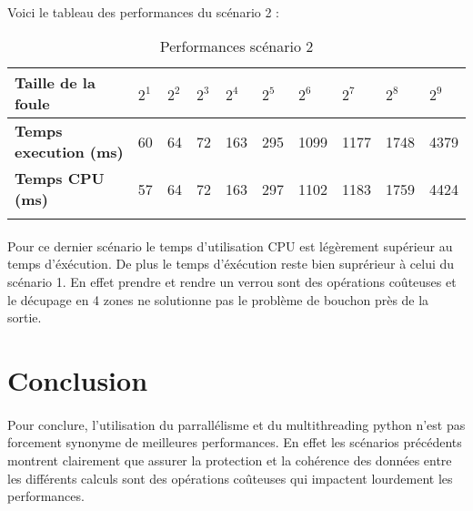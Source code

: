 \documentclass[12pt,oneside,a4paper]{article}
\begin{document}
\paragraph{}
Voici le tableau des performances du scénario 2 :

\begin{table}[h]
  \centering
  \small
  \begin{tabular}{llllllllll}
  \hline
  \multicolumn{1}{|l|}{\textbf{Taille de la foule}}                     & \multicolumn{1}{l|}{$2^1$} & \multicolumn{1}{l|}{$2^2$} & \multicolumn{1}{l|}{$2^3$} & \multicolumn{1}{l|}{$2^4$} & \multicolumn{1}{l|}{$2^5$} & \multicolumn{1}{l|}{$2^6$} & \multicolumn{1}{l|}{$2^7$} & \multicolumn{1}{l|}{$2^8$} & \multicolumn{1}{l|}{$2^9$} \\ \hline
  \multicolumn{1}{|l|}{\textbf{Temps execution (ms)}} & \multicolumn{1}{l|}{60}  & \multicolumn{1}{l|}{64}  & \multicolumn{1}{l|}{72}  & \multicolumn{1}{l|}{163}  & \multicolumn{1}{l|}{295}  & \multicolumn{1}{l|}{1099}  & \multicolumn{1}{l|}{1177}  & \multicolumn{1}{l|}{1748}  & \multicolumn{1}{l|}{4379}  \\ \hline
  \multicolumn{1}{|l|}{\textbf{Temps CPU (ms)}}    & \multicolumn{1}{l|}{57}  & \multicolumn{1}{l|}{64}  & \multicolumn{1}{l|}{72}  & \multicolumn{1}{l|}{163}  & \multicolumn{1}{l|}{297}  & \multicolumn{1}{l|}{1102}  & \multicolumn{1}{l|}{1183}  & \multicolumn{1}{l|}{1759}  & \multicolumn{1}{l|}{4424}  \\ \hline
                                                                        &                        &                        &                        &                        &                        &                        &                        &                        &                       
  \end{tabular}
  \caption{Performances scénario 2}
  \label{Performances scénario 2}
\end{table}

\paragraph{}
Pour ce dernier scénario le temps d'utilisation CPU est légèrement supérieur au temps d'éxécution. De 
plus le temps d'éxécution reste bien suprérieur à celui du scénario 1. En effet prendre et rendre un verrou
sont des opérations coûteuses et le décupage en 4 zones ne solutionne pas le problème de bouchon près de la sortie.

\section{Conclusion}
\paragraph{}
Pour conclure, l'utilisation du parrallélisme et du multithreading python n'est pas forcement synonyme
de meilleures performances. En effet les scénarios précédents montrent clairement que assurer la protection
et la cohérence des données entre les différents calculs sont des opérations coûteuses qui impactent lourdement
les performances.
\end{document}
